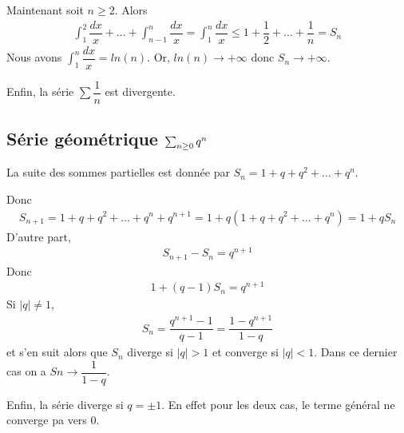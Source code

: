 \documentclass[letterpaper,10pt,french]{sphinxmanual}
\begin{document}
\sphinxAtStartPar
Maintenant soit \(n\geq 2\). Alors
\begin{equation*}
\begin{split}
\int_1^{2}\dfrac{dx}{x}+ \ldots + \int_{n-1}^{n}\dfrac{dx}{x}=\int_1^{n}\dfrac{dx}{x}\leq 1+ \dfrac{1}{2} + \ldots + \dfrac{1}{n} =S_n
\end{split}
\end{equation*}
\sphinxAtStartPar
Nous avons \(\int_1^{n}\dfrac{dx}{x}=ln(n)\). Or, \(ln(n) \to +\infty\) donc \(S_n \to +\infty\).

\sphinxAtStartPar
Enfin, la série \(\sum \dfrac{1}{n}\) est divergente.


\subsection{Série géométrique \protect\(\sum_{n\geq 0} q^n\protect\)}
\label{\detokenize{series:serie-geometrique-sum-n-geq-0-q-n}}
\sphinxAtStartPar
La suite des sommes partielles est donnée par \(S_n = 1+q+q^2 + \ldots + q^n\).

\sphinxAtStartPar
Donc
\begin{equation*}
\begin{split}
S_{n+1}= 1+q+q^2 + \ldots + q^n + q^{n+1}=1+q(1+q+q^2 + \ldots + q^n)=1+qS_n
\end{split}
\end{equation*}
\sphinxAtStartPar
D’autre part,
\begin{equation*}
\begin{split}
S_{n+1}- S_n = q^{n+1}
\end{split}
\end{equation*}
\sphinxAtStartPar
Donc
\begin{equation*}
\begin{split}
1+(q-1)S_n=q^{n+1}
\end{split}
\end{equation*}
\sphinxAtStartPar
Si \(|q|\neq 1\),
\begin{equation*}
\begin{split}
S_n = \dfrac{q^{n+1}-1}{q-1}=\dfrac{1-q^{n+1}}{1-q}
\end{split}
\end{equation*}
\sphinxAtStartPar
et s’en suit alors que \(S_n\) diverge si \(|q| > 1\) et converge si \(|q| < 1\). Dans ce dernier cas on a \(Sn \to \dfrac{1}{1-q}\).

\sphinxAtStartPar
Enfin, la série diverge si
\(q = ±1\). En effet pour les deux cas, le terme général ne converge pa vers 0.
\end{document}
